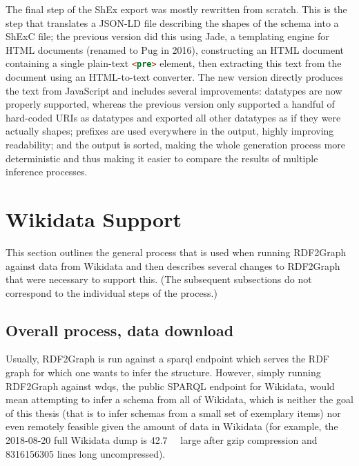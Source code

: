 The final step of the ShEx export was mostly rewritten from scratch.
This is the step that translates a JSON-LD file describing the shapes of the schema
into a ShExC file;
the previous version did this using Jade,
a templating engine for HTML documents (renamed to Pug in 2016),
constructing an HTML document containing a single plain-text \lstinline[language=html]{<pre>} element,
then extracting this text from the document using an HTML-to-text converter.
The new version directly produces the text from JavaScript
and includes several improvements:
datatypes are now properly supported,
whereas the previous version only supported a handful of hard-coded URIs as datatypes
and exported all other datatypes as if they were actually shapes;
prefixes are used everywhere in the output, highly improving readability;
and the output is sorted, making the whole generation process more deterministic
and thus making it easier to compare the results of multiple inference processes.


\section{Wikidata Support}
\label{sec:RDF2Graph+Wikidata:Wikidata}

This section outlines the general process that is used when running RDF2Graph against data from Wikidata
and then describes several changes to RDF2Graph that were necessary to support this.
(The subsequent subsections do not correspond to the individual steps of the process.)

\subsection{Overall process, data download}
\label{subsec:RDF2Graph+Wikidata:Wikidata:download}

Usually, RDF2Graph is run against a \gls{sparql} endpoint
which serves the RDF graph for which one wants to infer the structure.
However, simply running RDF2Graph against \gls{wdqs}, the public SPARQL endpoint for Wikidata,
would mean attempting to infer a schema from all of Wikidata,
which is neither the goal of this thesis
(that is to infer schemas from a small set of exemplary items)
nor even remotely feasible given the amount of data in Wikidata
(for example, the 2018-08-20 full Wikidata dump is \SI{42.7}{\giga\byte} large after gzip compression %
and \num{8316156305} lines long uncompressed).

